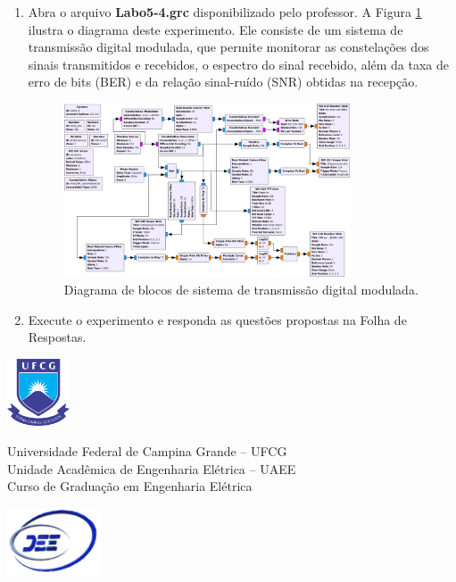 \documentclass[12pt,addpoints]{exam}
\begin{document}
\begin{enumerate}
    \item  Abra o arquivo \textbf{Labo5-4.grc} disponibilizado pelo professor. A Figura \ref{fig:GRC_5-4} ilustra o diagrama deste experimento. Ele consiste de um sistema de transmissão digital modulada, que permite monitorar as constelações dos sinais transmitidos e recebidos, o espectro do sinal recebido, além da taxa de erro de bits (BER) e da relação sinal-ruído (SNR) obtidas na recepção.
    \begin{figure}[htb]
        \centering
        \includegraphics[width=0.8\textwidth]{Figuras/Labo5-4}
        \caption{Diagrama de blocos de sistema de transmissão digital modulada.} 
        \label{fig:GRC_5-4}
    \end{figure}
  \item Execute o experimento e responda as questões propostas na Folha de Respostas.
\end{enumerate}


\clearpage
\newpage {}

\noindent \includegraphics[height=2cm]{../Figuras/UFCGLogo} \hfill
\begin{minipage}{.66\textwidth} \large \centering \vspace{-1.8cm}
    Universidade Federal de Campina Grande -- UFCG \\
    Unidade Acadêmica de Engenharia Elétrica -- UAEE \\
    Curso de Graduação em Engenharia Elétrica
\end{minipage}
\hfill \includegraphics[height=2cm]{../Figuras/DEELogo} \\[12pt]
\end{document}
